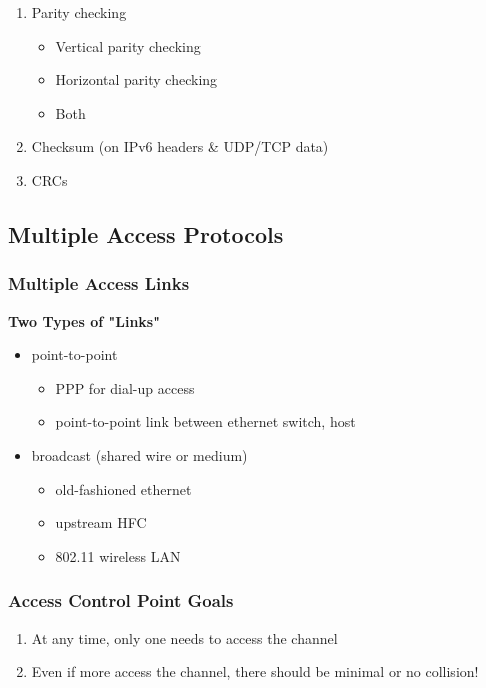 \documentclass{article}
\newcommand{\topic}[1]{\noindent\textbf{#1}}
\begin{document}
\begin{enumerate}
	\item Parity checking
	\begin{itemize}[noitemsep, nolistsep]
		\item Vertical parity checking
		\item Horizontal parity checking
		\item Both
	\end{itemize}
	\item Checksum (on IPv6 headers \& UDP/TCP data)
	\item CRCs
\end{enumerate}

\subsection{Multiple Access Protocols}
	
\subsubsection*{Multiple Access Links}

\topic{Two Types of "Links"}
\begin{itemize}
	\item point-to-point
	\begin{itemize}
		\item PPP for dial-up access
		\item point-to-point link between ethernet switch, host
	\end{itemize}
	\item broadcast (shared wire or medium)
	\begin{itemize}
		\item old-fashioned ethernet
		\item upstream HFC
		\item 802.11 wireless LAN
	\end{itemize}
\end{itemize}

\subsubsection*{Access Control Point Goals}

\begin{enumerate}
	\item At any time, only one needs to access the channel
	\item Even if more access the channel, there should be minimal or no collision!
\end{enumerate}
\end{document}
